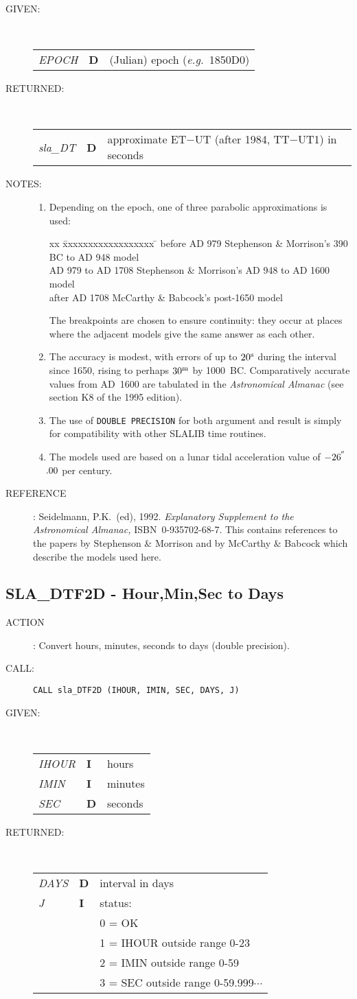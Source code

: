 \documentclass[11pt,twoside]{article}
\newcommand{\xlabel}[1]{}
\newcommand{\arcsec}[2] {\arcseci{#1}$\hspace{-0.4em}.#2$}
\newcommand{\arcsec}[2] {
      {$#1\hspace{-0.05em}^{'\hspace{-0.1em}'}\hspace{-0.4em}.#2$}
   }
\newcommand{\arcseci}[1] {$#1\hspace{-0.05em}$\raisebox{-0.5ex}
                         {$^{'\hspace{-0.1em}'}$}}
\renewcommand{\arcseci}[1] {$#1\hspace{-0.05em}^{'\hspace{-0.1em}'}$}
\newcommand{\routine}[3]
{\hbadness=10000
  \vbox
  {
    \rule{\textwidth}{0.3mm}\\
    {\Large {\bf #1} \hfill #2 \hfill {\bf #1}}\\
    \setlength{\oldspacing}{\topsep}
    \setlength{\topsep}{0.3ex}
    \begin{description}
      #3
    \end{description}
    \setlength{\topsep}{\oldspacing}
  }
}
\renewcommand{\routine}[3]
   {
      \subsection{#1\xlabel{#1} - #2\label{#1}}
       \begin{description}
         #3
       \end{description}
   }
\newcommand{\action}[1]
{\item[ACTION]: #1}
\newcommand{\action}[1]
   {\item[ACTION:] #1}
\newcommand{\call}[1]
{\item[CALL]: \hspace{0.4em}{\tt #1}}
\newlength{\oldspacing}
\renewcommand{\call}[1]
   {
    \item[CALL:] {\tt #1}
   }
\newcommand{\args}[2]
{
  \goodbreak
  \setlength{\oldspacing}{\topsep}
  \setlength{\topsep}{0.3ex}
  \begin{description}
  \item[#1]:\\[1.5ex]
    \begin{tabular}{p{7em}p{6em}p{22em}}
      #2
    \end{tabular}
  \end{description}
  \setlength{\topsep}{\oldspacing}
}
\renewcommand{\args}[2]
   {
     \begin{description}
        \item[#1:]\\
        \begin{tabular}{p{7em}p{6em}l}
           #2
        \end{tabular}
     \end{description}
   }
\newcommand{\spec}[3]
{
  {\em {#1}} & {\bf \mbox{#2}} & {#3}
}
\newcommand{\notes}[1]
{
  \goodbreak
  \setlength{\oldspacing}{\topsep}
  \setlength{\topsep}{0.3ex}
  \begin{description}
    \item[NOTES]:
        #1
  \end{description}
  \setlength{\topsep}{\oldspacing}
}
\renewcommand{\notes}[1]
   {
      \begin{description}
         \item[NOTES:]
            #1
      \end{description}
   }
\newcommand{\aref}[1]
{
  \goodbreak
  \setlength{\oldspacing}{\topsep}
  \setlength{\topsep}{0.3ex}
  \begin{description}
    \item[REFERENCE]:
        #1
  \end{description}
  \setlength{\topsep}{\oldspacing}
}
\newcommand{\aref}[1]
   {
     \begin{description}
       \item[REFERENCE:]
           #1
     \end{description}
   }
\begin{document}
\args{GIVEN}
{
 \spec{EPOCH}{D}{(Julian) epoch ({\it e.g.}\ 1850D0)}
}
\args{RETURNED}
{
 \spec{sla\_DT}{D}{approximate ET$-$UT (after 1984, TT$-$UT1) in seconds}
}
\notes
{
 \begin{enumerate}
  \item Depending on the epoch, one of three parabolic approximations
        is used:
\begin{tabbing}
xx \= xxxxxxxxxxxxxxxxxx \= \kill
\> before AD 979 \> Stephenson \& Morrison's 390 BC to AD 948 model \\
\> AD 979 to AD 1708 \> Stephenson \& Morrison's AD 948 to AD 1600 model \\
\> after AD 1708 \> McCarthy \& Babcock's post-1650 model
\end{tabbing}
        The breakpoints are chosen to ensure continuity:  they occur
        at places where the adjacent models give the same answer as
        each other.
  \item The accuracy is modest, with errors of up to $20^{\rm s}$ during
        the interval since 1650, rising to perhaps $30^{\rm m}$
        by 1000~BC.  Comparatively accurate values from AD~1600
        are tabulated in
        the {\it Astronomical Almanac}\/ (see section K8 of the 1995
        edition).
  \item The use of {\tt DOUBLE PRECISION} for both argument and result is
        simply for compatibility with other SLALIB time routines.
  \item The models used are based on a lunar tidal acceleration value
        of \arcsec{-26}{00} per century.
 \end{enumerate}
}
\aref{Seidelmann, P.K.\ (ed), 1992.  {\it Explanatory
      Supplement to the Astronomical Almanac,}\/ ISBN~0-935702-68-7.
      This contains references to the papers by Stephenson \& Morrison
      and by McCarthy \& Babcock which describe the models used here.}
\routine{SLA\_DTF2D}{Hour,Min,Sec to Days}
{
 \action{Convert hours, minutes, seconds to days (double precision).}
 \call{CALL sla\_DTF2D (IHOUR, IMIN, SEC, DAYS, J)}
}
\args{GIVEN}
{
 \spec{IHOUR}{I}{hours} \\
 \spec{IMIN}{I}{minutes} \\
 \spec{SEC}{D}{seconds}
}
\args{RETURNED}
{
 \spec{DAYS}{D}{interval in days} \\
 \spec{J}{I}{status:} \\
 \spec{}{}{\hspace{1.5em} 0 = OK} \\
 \spec{}{}{\hspace{1.5em} 1 = IHOUR outside range 0-23} \\
 \spec{}{}{\hspace{1.5em} 2 = IMIN outside range 0-59} \\
 \spec{}{}{\hspace{1.5em} 3 = SEC outside range 0-59.999$\cdots$}
}
\end{document}
